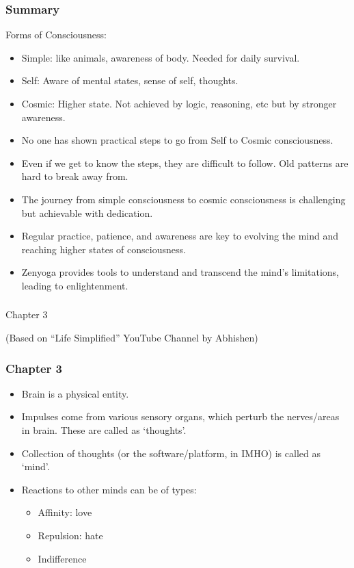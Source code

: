 \begin{frame}[fragile]\frametitle{Summary}
Forms of Consciousness:
\begin{itemize}
\item Simple: like animals, awareness of body. Needed for daily survival.
\item Self: Aware of mental states, sense of self, thoughts.
\item Cosmic: Higher state. Not achieved by logic, reasoning, etc but by stronger awareness.
\item No one has shown practical steps to go from Self to Cosmic consciousness.
\item Even if we get to know the steps, they are difficult to follow. Old patterns are hard to break away from.
\item The journey from simple consciousness to cosmic consciousness is challenging but achievable with dedication.
\item Regular practice, patience, and awareness are key to evolving the mind and reaching higher states of consciousness.
\item Zenyoga provides tools to understand and transcend the mind's limitations, leading to enlightenment.
\end{itemize}


\end{frame}


\begin{frame}[fragile]\frametitle{}
\begin{center}
{\Large Chapter 3}

{\tiny (Based on ``Life Simplified'' YouTube Channel by Abhishen)}

\end{center}
\end{frame}


\begin{frame}[fragile]
\frametitle{Chapter 3}
\begin{itemize}
\item Brain is a physical entity.
\item Impulses come from various sensory organs, which perturb the nerves/areas in brain. These are called as `thoughts'.
\item Collection of thoughts (or the software/platform, in IMHO) is called as `mind'.
\item Reactions to other minds can be of types:
\begin{itemize}
\item Affinity: love
\item Repulsion: hate
\item Indifference
\end{itemize}
\end{itemize}


\end{frame}


